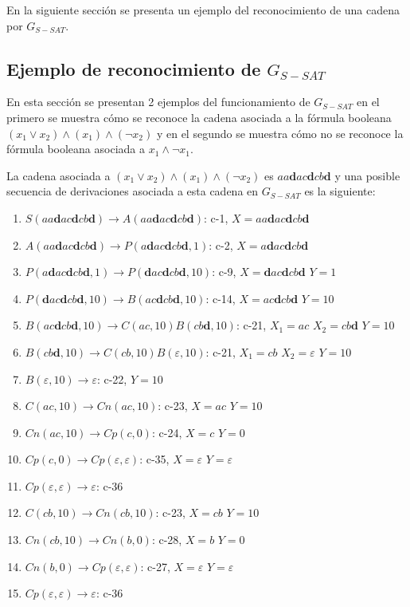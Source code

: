 En la siguiente sección se presenta un ejemplo del reconocimiento de una cadena por $G_{S-SAT}$.

\subsection{Ejemplo de reconocimiento de $G_{S-SAT}$}

En esta sección se presentan 2 ejemplos del funcionamiento de $G_{S-SAT}$ en el primero se muestra cómo se reconoce la cadena asociada a la fórmula booleana $(x_1 \vee x_2) \wedge (x_1) \wedge (\neg x_2)$ y en el segundo se muestra cómo no se reconoce la fórmula booleana asociada a $x_1 \wedge \neg x_1$.

La cadena asociada a $(x_1 \vee x_2) \wedge (x_1) \wedge (\neg x_2)$ es $aa\mathbf{d}ac\mathbf{d}cb\mathbf{d}$ y una posible secuencia de derivaciones
asociada a esta cadena en $G_{S-SAT}$ es la siguiente:

\begin{enumerate}
    \item $S(aa\mathbf{d}ac\mathbf{d}cb\mathbf{d})\to A(aa\mathbf{d}ac\mathbf{d}cb\mathbf{d})$: c-1, $X=aa\mathbf{d}ac\mathbf{d}cb\mathbf{d}$
    \item $A(aa\mathbf{d}ac\mathbf{d}cb\mathbf{d})\to P(a\mathbf{d}ac\mathbf{d}cb\mathbf{d},1)$: c-2, $X=a\mathbf{d}ac\mathbf{d}cb\mathbf{d}$
    \item $P(a\mathbf{d}ac\mathbf{d}cb\mathbf{d},1)\to P(\mathbf{d}ac\mathbf{d}cb\mathbf{d},10)$: c-9, $X=\mathbf{d}ac\mathbf{d}cb\mathbf{d}$ $Y=1$
    \item $P(\mathbf{d}ac\mathbf{d}cb\mathbf{d},10)\to B(ac\mathbf{d}cb\mathbf{d}, 10)$: c-14, $X=ac\mathbf{d}cb\mathbf{d}$ $Y=10$
    \item $B(ac\mathbf{d}cb\mathbf{d}, 10)\to C(ac,10) B(cb\mathbf{d},10)$: c-21, $X_1=ac$ $X_2=cb\mathbf{d}$ $Y=10$
    \item $B(cb\mathbf{d},10)\to C(cb,10) B(\varepsilon,10)$: c-21, $X_1=cb$ $X_2=\varepsilon$ $Y=10$
    \item $B(\varepsilon,10)\to \varepsilon$: c-22, $Y=10$
    \item $C(ac,10)\to Cn(ac,10)$: c-23, $X=ac$ $Y=10$
    \item $Cn(ac,10)\to Cp(c,0)$: c-24, $X=c$ $Y=0$
    \item $Cp(c,0)\to Cp(\varepsilon,\varepsilon)$: c-35, $X=\varepsilon$ $Y=\varepsilon$
    \item $Cp(\varepsilon, \varepsilon) \to \varepsilon$: c-36
    \item $C(cb,10)\to Cn(cb,10)$: c-23, $X=cb$ $Y=10$
    \item $Cn(cb,10)\to Cn(b,0)$: c-28, $X=b$ $Y=0$
    \item $Cn(b,0)\to Cp(\varepsilon,\varepsilon)$: c-27, $X=\varepsilon$ $Y=\varepsilon$
    \item $Cp(\varepsilon, \varepsilon) \to \varepsilon$: c-36
\end{enumerate}

